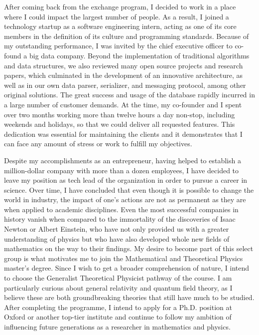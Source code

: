 \documentclass[10pt]{article}
\begin{document}
After coming back from the exchange program, I decided to work in a place where I could impact the largest number of people. As a result, I joined a technology startup as a software engineering intern, acting as one of its core members in the definition of its culture and programming standards. Because of my outstanding performance, I was invited by the chief executive officer to co-found a big data company. Beyond the implementation of traditional algorithms and data structures, we also reviewed many open source projects and research papers, which culminated in the development of an innovative architecture, as well as in our own data parser, serializer, and messaging protocol, among other original solutions. The great success and usage of the database rapidly incurred in a large number of customer demands. At the time, my co-founder and I spent over two months working more than twelve hours a day non-stop, including weekends and holidays, so that we could deliver all requested features. This dedication was essential for maintaining the clients and it demonstrates that I can face any amount of stress or work to fulfill my objectives.

Despite my accomplishments as an entrepreneur, having helped to establish a million-dollar company with more than a dozen employees, I have decided to leave my position as tech lead of the organization in order to pursue a career in science. Over time, I have concluded that even though it is possible to change the world in industry, the impact of one's actions are not as permanent as they are when applied to academic disciplines. Even the most successful companies in history vanish when compared to the immortality of the discoveries of Isaac Newton or Albert Einstein, who have not only provided us with a greater understanding of physics but who have also developed whole new fields of mathematics on the way to their findings. My desire to become part of this select group is what motivates me to join the Mathematical and Theoretical Physics master's degree. Since I wish to get a broader comprehension of nature, I intend to choose the Generalist Theoretical Physicist pathway of the course. I am particularly curious about general relativity and quantum field theory, as I believe these are both groundbreaking theories that still have much to be studied. After completing the programme, I intend to apply for a Ph.D. position at Oxford or another top-tier institute and continue to follow my ambition of influencing future generations as a researcher in mathematics and physics.
\end{document}
